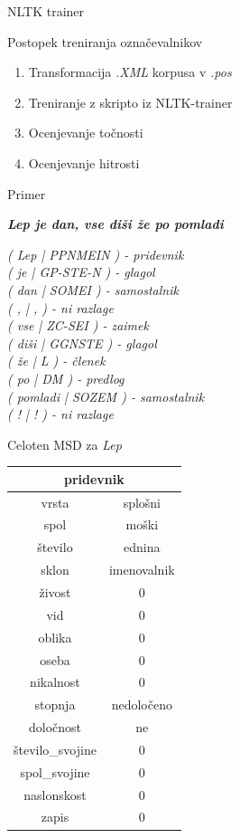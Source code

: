 \documentclass{beamer}
\begin{document}
\begin{frame}{NLTK trainer}
\end{frame}

\begin{frame}{Postopek treniranja označevalnikov}
\begin{enumerate}
\item Transformacija \textit{.XML} korpusa v \textit{.pos}
\item Treniranje z skripto iz NLTK-trainer
\item Ocenjevanje točnosti
\item Ocenjevanje hitrosti
\end{enumerate}
\end{frame}

\begin{frame}{Primer}
\begin{center}
\textit{\textbf{Lep je dan, vse diši že po pomladi}}
\end{center}
\textit{( Lep  |  PPNMEIN ) - pridevnik\\
	( je  |  GP-STE-N ) - glagol\\
	( dan  |  SOMEI ) - samostalnik\\
	( ,  |  , ) - ni razlage\\
	( vse  |  ZC-SEI ) - zaimek\\
	( diši  |  GGNSTE ) - glagol\\
	( že  |  L ) - členek\\
	( po  |  DM ) - predlog\\
	( pomladi  |  SOZEM ) - samostalnik\\
	( !  |  ! ) - ni razlage}\\
\end{frame}

\begin{frame}{Celoten MSD za \textit{Lep} }
\begin{center}
\begin{tabular}{c|c}
\multicolumn{2}{c}{pridevnik}\\\hline\hline
vrsta & splošni \\
spol & moški \\
število & ednina \\
sklon & imenovalnik \\
živost & 0 \\
vid & 0 \\
oblika & 0 \\
oseba & 0 \\
nikalnost & 0 \\
stopnja & nedoločeno \\
določnost & ne \\
število\_svojine & 0 \\
spol\_svojine & 0 \\
naslonskost & 0 \\
zapis & 0 \\
\end{tabular}
\end{center}
\end{frame}
\end{document}
